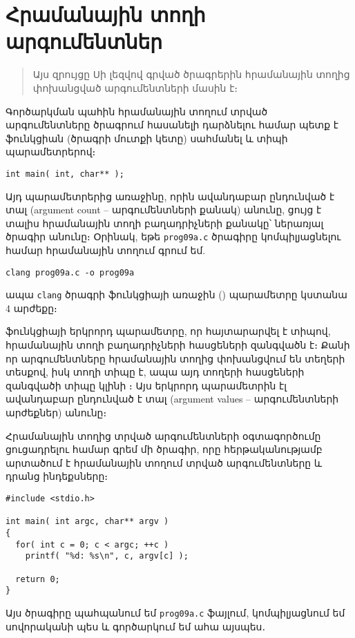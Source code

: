 \chapter{Հրամանային տողի արգումենտներ}

\begin{quote}
Այս զրույցը Սի լեզվով գրված ծրագրերին հրամանային տողից
փոխանցված արգումենտների մասին է։
\end{quote}

Գործարկման պահին հրամանային տողում տրված արգումենտները ծրագրում
հասանելի դարձնելու համար պետք է  ֆունկցիան (ծրագրի
մուտքի կետը) սահմանել  և  տիպի պարամետրերով։

\begin{Verbatim}
int main( int, char** );
\end{Verbatim}

Այդ պարամետրերից առաջինը, որին ավանդաբար ընդունված է տալ
 (argument count -- արգումենտների քանակ) անունը,
ցույց է տալիս հրամանային տողի բաղադրիչների քանակը՝ ներառյալ
ծրագիր անունը։ Օրինակ, եթե \texttt{prog09a.c} ծրագիրը
կոմպիլյացնելու համար հրամանային տողում գրում եմ.

\begin{Verbatim}
clang prog09a.c -o prog09a
\end{Verbatim}

ապա \texttt{clang} ծրագրի  ֆունկցիայի առաջին
() պարամետրը կստանա 4 արժեքը։

 ֆունկցիայի երկրորդ պարամետրը, որ հայտարարվել է
 տիպով, հրամանային տողի բաղադրիչների հասցեների զանգվածն
է։ Քանի որ արգումենտները հրամանային տողից փոխանցվում են տեղերի
տեսքով, իսկ տողի տիպը  է, ապա այդ տողերի հասցեների
զանգվածի տիպը կլինի ։ Այս երկրորդ պարամետրին էլ
ավանդաբար ընդունված է տալ  (argument values --
արգումենտների արժեքներ) անունը։

Հրամանային տողից տրված արգումենտների օգտագործումը ցուցադրելու
համար գրեմ մի ծրագիր, որը հերթականությամբ արտածում է հրամանային
տողում տրված արգումենտները և դրանց ինդեքսները։

\begin{Verbatim}
#include <stdio.h>

int main( int argc, char** argv )
{
  for( int c = 0; c < argc; ++c )
    printf( "%d: %s\n", c, argv[c] );

  return 0;
}
\end{Verbatim}

Այս ծրագիրը պահպանում եմ \texttt{prog09a.c} ֆայլում, կոմպիլյացնում
եմ սովորականի պես և գործարկում եմ ահա այսպես․

